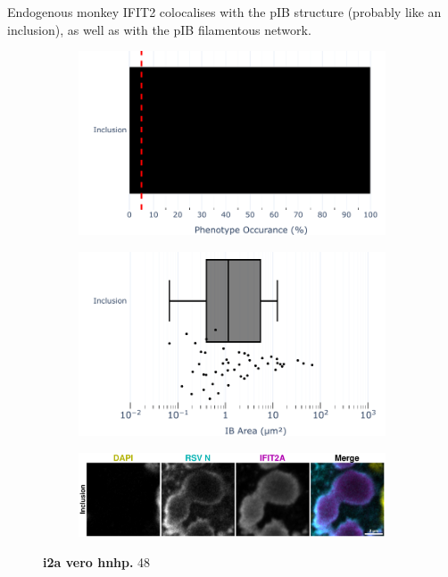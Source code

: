 Endogenous monkey IFIT2 colocalises with the pIB structure (probably like an inclusion), as well as with the pIB filamentous network.

\begin{figure}
    \begin{subfigure}{0.495\textwidth}
        \caption{}
        \includegraphics[width=1\linewidth]{10. Chapter 5/Figs/02. pIB/02. IFIT2A/04. bar_i2a_vero_hnhp.pdf} 
    \end{subfigure}
    \begin{subfigure}{0.495\textwidth}
        \caption{}
        \includegraphics[width=1\linewidth]{10. Chapter 5/Figs/02. pIB/02. IFIT2A/05. box_i2a_vero_hnhp.pdf}
    \end{subfigure}
    \begin{subfigure}{1\textwidth}
        \caption{}
        \includegraphics[width=1\linewidth]{10. Chapter 5/Figs/02. pIB/02. IFIT2A/06. i2a-vero-hnhp.pdf} 
    \end{subfigure}
    \caption[i2a vero hnhp]{\textbf{i2a vero hnhp.} 48}
    \label{fig:i2a vero hnhp}
\end{figure}


